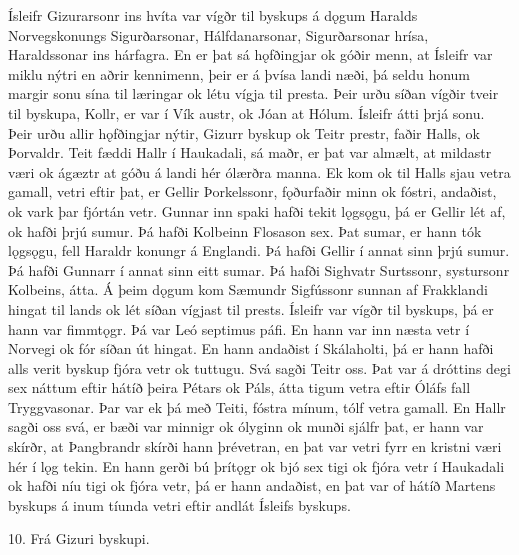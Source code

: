 Ísleifr Gizurarsonr ins hvíta var vígðr til byskups á dǫgum Haralds Norvegskonungs Sigurðarsonar, Hálfdanarsonar, Sigurðarsonar hrísa, Haraldssonar ins hárfagra. En er þat sá hǫfðingjar ok góðir menn, at Ísleifr var miklu nýtri en aðrir kennimenn, þeir er á þvísa landi næði, þá seldu honum margir sonu sína til læringar ok létu vígja til presta. Þeir urðu síðan vígðir tveir til byskupa, Kollr, er var í Vík austr, ok Jóan at Hólum.
Ísleifr átti þrjá sonu. Þeir urðu allir hǫfðingjar nýtir, Gizurr byskup ok Teitr prestr, faðir Halls, ok Þorvaldr. Teit fæddi Hallr í Haukadali, sá maðr, er þat var almælt, at mildastr væri ok ágæztr at góðu á landi hér ólærðra manna. Ek kom ok til Halls sjau vetra gamall, vetri eftir þat, er Gellir Þorkelssonr, fǫðurfaðir minn ok fóstri, andaðist, ok vark þar fjórtán vetr.
Gunnar inn spaki hafði tekit lǫgsǫgu, þá er Gellir lét af, ok hafði þrjú sumur. Þá hafði Kolbeinn Flosason sex. Þat sumar, er hann tók lǫgsǫgu, fell Haraldr konungr á Englandi. Þá hafði Gellir í annat sinn þrjú sumur. Þá hafði Gunnarr í annat sinn eitt sumar. Þá hafði Sighvatr Surtssonr, systursonr Kolbeins, átta.
Á þeim dǫgum kom Sæmundr Sigfússonr sunnan af Frakklandi hingat til lands ok lét síðan vígjast til prests.
Ísleifr var vígðr til byskups, þá er hann var fimmtǫgr. Þá var Leó septimus páfi. En hann var inn næsta vetr í Norvegi ok fór síðan út hingat. En hann andaðist í Skálaholti, þá er hann hafði alls verit byskup fjóra vetr ok tuttugu. Svá sagði Teitr oss. Þat var á dróttins degi sex náttum eftir hátíð þeira Pétars ok Páls, átta tigum vetra eftir Óláfs fall Tryggvasonar.
Þar var ek þá með Teiti, fóstra mínum, tólf vetra gamall. En Hallr sagði oss svá, er bæði var minnigr ok ólyginn ok munði sjálfr þat, er hann var skírðr, at Þangbrandr skírði hann þrévetran, en þat var vetri fyrr en kristni væri hér í lǫg tekin. En hann gerði bú þrítǫgr ok bjó sex tigi ok fjóra vetr í Haukadali ok hafði níu tigi ok fjóra vetr, þá er hann andaðist, en þat var of hátíð Martens byskups á inum tíunda vetri eftir andlát Ísleifs byskups.


10. Frá Gizuri byskupi.

